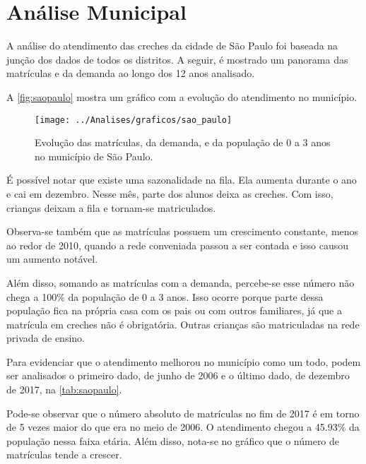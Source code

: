 \chapter{Análise Municipal}
\label{cap:sp}

\lettrine{A}{} análise do atendimento das creches da cidade de São Paulo foi baseada na junção dos dados de todos os distritos. A seguir, é mostrado um panorama das matrículas e da demanda ao longo dos 12 anos analisado.

A \autoref{fig:saopaulo} mostra um gráfico com a evolução do atendimento no município.

\begin{figure}[H]
	\centering
	\texttt{[image: ../Analises/graficos/sao\_paulo]}
	\caption{Evolução das matrículas, da demanda, e da população de 0 a 3 anos no município de São Paulo.}
	\label{fig:saopaulo}
\end{figure}

É possível notar que existe uma sazonalidade na fila. Ela aumenta durante o ano e cai em dezembro. Nesse mês, parte dos alunos deixa as creches. Com isso, crianças deixam a fila e tornam-se matriculados.

Observa-se também que as matrículas possuem um crescimento constante, menos ao redor de 2010, quando a rede conveniada passou a ser contada e isso causou um aumento notável. 

Além disso, somando as matrículas com a demanda, percebe-se esse número não chega a 100\% da população de 0 a 3 anos. Isso ocorre porque parte dessa população fica na própria casa com os pais ou com outros familiares, já que a matrícula em creches não é obrigatória. Outras crianças são matriculadas na rede privada de ensino.

Para evidenciar que o atendimento melhorou no município como um todo, podem ser analisados o primeiro dado, de junho de 2006 e o último dado, de dezembro de 2017, na \autoref{tab:saopaulo}.

Pode-se observar que o número absoluto de matrículas no fim de 2017 é em torno de 5 vezes maior do que era no meio de 2006. O atendimento chegou a 45.93\% da população nessa faixa etária. Além disso, nota-se no gráfico que o número de matrículas tende a crescer.

